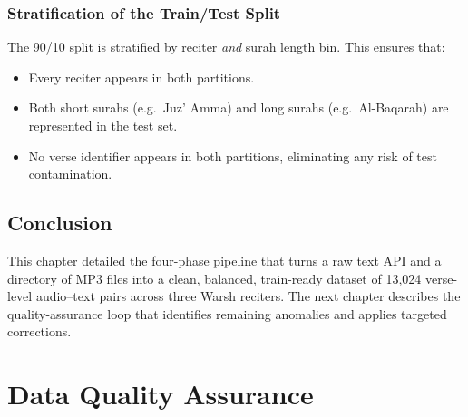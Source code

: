 \subsection{Stratification of the Train/Test Split}

The 90/10 split is stratified by reciter \emph{and} surah length bin.
This ensures that:
\begin{itemize}
  \item Every reciter appears in both partitions.
  \item Both short surahs (e.g.\ Juz' Amma) and long surahs (e.g.\
        Al-Baqarah) are represented in the test set.
  \item No verse identifier appears in both partitions, eliminating any
        risk of test contamination.
\end{itemize}

\section{Conclusion}

This chapter detailed the four-phase pipeline that turns a raw text API
and a directory of MP3 files into a clean, balanced, train-ready dataset
of 13{,}024 verse-level audio--text pairs across three Warsh reciters.
The next chapter describes the quality-assurance loop that identifies
remaining anomalies and applies targeted corrections.

\chapter{Data Quality Assurance}
\label{ch:mt_qa}

